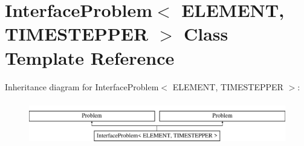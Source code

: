 \hypertarget{classInterfaceProblem}{}\section{Interface\+Problem$<$ E\+L\+E\+M\+E\+NT, T\+I\+M\+E\+S\+T\+E\+P\+P\+ER $>$ Class Template Reference}
\label{classInterfaceProblem}
Inheritance diagram for Interface\+Problem$<$ E\+L\+E\+M\+E\+NT, T\+I\+M\+E\+S\+T\+E\+P\+P\+ER $>$\+:\begin{figure}[H]
\begin{center}
\leavevmode
\includegraphics[height=1.924399cm]{classInterfaceProblem}
\end{center}
\end{figure}
